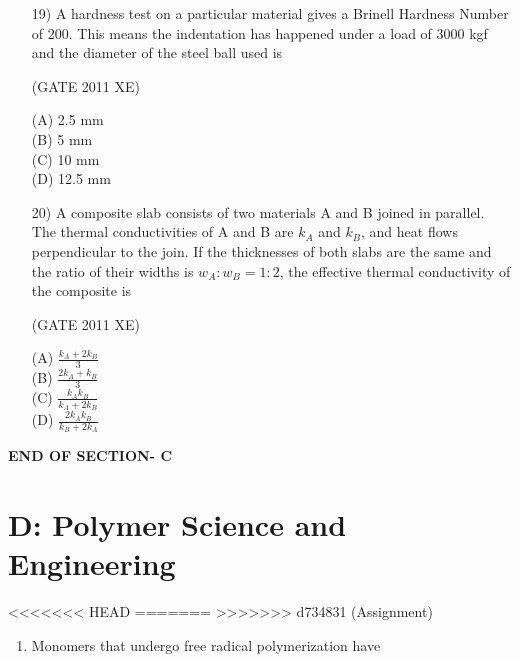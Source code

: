 \documentclass[journal,12pt,onecolumn]{IEEEtran}
\begin{document}
\begin{enumerate}
\begin{enumerate}
\begin{enumerate}
\newpage
\item[19)] A hardness test on a particular material gives a Brinell Hardness Number of 200. This means the indentation has happened under a load of 3000 kgf and the diameter of the steel ball used is

\hfill{(GATE 2011 XE)}\\
\begin{multicols}{4}
(A) 2.5 mm \\
(B) 5 mm \\
(C) 10 mm \\
(D) 12.5 mm
\end{multicols}


\item[20)] A composite slab consists of two materials A and B joined in parallel. The thermal conductivities of A and B are $k_A$ and $k_B$, and heat flows perpendicular to the join. If the thicknesses of both slabs are the same and the ratio of their widths is $w_A : w_B = 1:2$, the effective thermal conductivity of the composite is

\hfill{(GATE 2011 XE)}\\
\begin{multicols}{4}
(A) $\frac{k_A + 2k_B}{3}$ \\
(B) $\frac{2k_A + k_B}{3}$ \\
(C) $\frac{k_A k_B}{k_A + 2k_B}$ \\
(D) $\frac{2k_A k_B}{k_B + 2k_A}$
\end{multicols}

\end{enumerate}


\vspace{3\baselineskip}
    \begin{center}
    \textbf{\Large END OF SECTION- C}
    \end{center}

\newpage

\section*{D: Polymer Science and Engineering}
<<<<<<< HEAD
\bigskip
=======
\vspace{1cm}
>>>>>>> d734831 (Assignment)
\begin{enumerate}[label=\arabic*)]

\item Monomers that undergo free radical polymerization have\\


\end{enumerate}
\end{enumerate}
\end{enumerate}
\end{document}

